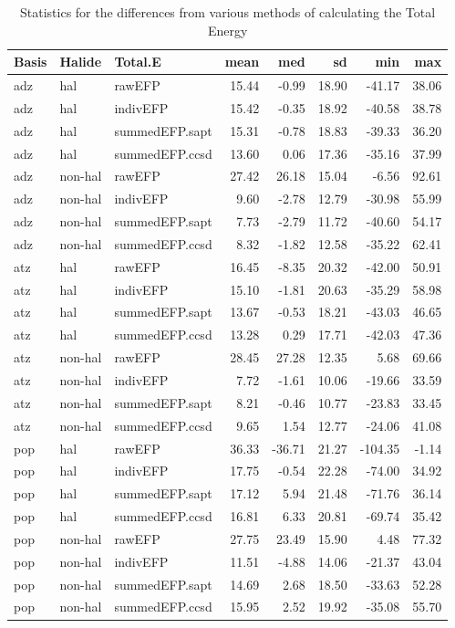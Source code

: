 \begin{table}[ht]
\centering
\footnotesize
\begin{tabular}{lllrrrrr}
  \hline
Basis & Halide & Total.E & mean & med & sd & min & max \\ 
  \hline
adz & hal & rawEFP & 15.44 & -0.99 & 18.90 & -41.17 & 38.06 \\ 
  adz & hal & indivEFP & 15.42 & -0.35 & 18.92 & -40.58 & 38.78 \\ 
  adz & hal & summedEFP.sapt & 15.31 & -0.78 & 18.83 & -39.33 & 36.20 \\ 
  adz & hal & summedEFP.ccsd & 13.60 & 0.06 & 17.36 & -35.16 & 37.99 \\ 
  adz & non-hal & rawEFP & 27.42 & 26.18 & 15.04 & -6.56 & 92.61 \\ 
  adz & non-hal & indivEFP & 9.60 & -2.78 & 12.79 & -30.98 & 55.99 \\ 
  adz & non-hal & summedEFP.sapt & 7.73 & -2.79 & 11.72 & -40.60 & 54.17 \\ 
  adz & non-hal & summedEFP.ccsd & 8.32 & -1.82 & 12.58 & -35.22 & 62.41 \\ 
  atz & hal & rawEFP & 16.45 & -8.35 & 20.32 & -42.00 & 50.91 \\ 
  atz & hal & indivEFP & 15.10 & -1.81 & 20.63 & -35.29 & 58.98 \\ 
  atz & hal & summedEFP.sapt & 13.67 & -0.53 & 18.21 & -43.03 & 46.65 \\ 
  atz & hal & summedEFP.ccsd & 13.28 & 0.29 & 17.71 & -42.03 & 47.36 \\ 
  atz & non-hal & rawEFP & 28.45 & 27.28 & 12.35 & 5.68 & 69.66 \\ 
  atz & non-hal & indivEFP & 7.72 & -1.61 & 10.06 & -19.66 & 33.59 \\ 
  atz & non-hal & summedEFP.sapt & 8.21 & -0.46 & 10.77 & -23.83 & 33.45 \\ 
  atz & non-hal & summedEFP.ccsd & 9.65 & 1.54 & 12.77 & -24.06 & 41.08 \\ 
  pop & hal & rawEFP & 36.33 & -36.71 & 21.27 & -104.35 & -1.14 \\ 
  pop & hal & indivEFP & 17.75 & -0.54 & 22.28 & -74.00 & 34.92 \\ 
  pop & hal & summedEFP.sapt & 17.12 & 5.94 & 21.48 & -71.76 & 36.14 \\ 
  pop & hal & summedEFP.ccsd & 16.81 & 6.33 & 20.81 & -69.74 & 35.42 \\ 
  pop & non-hal & rawEFP & 27.75 & 23.49 & 15.90 & 4.48 & 77.32 \\ 
  pop & non-hal & indivEFP & 11.51 & -4.88 & 14.06 & -21.37 & 43.04 \\ 
  pop & non-hal & summedEFP.sapt & 14.69 & 2.68 & 18.50 & -33.63 & 52.28 \\ 
  pop & non-hal & summedEFP.ccsd & 15.95 & 2.52 & 19.92 & -35.08 & 55.70 \\ 
   \hline
\end{tabular}
    \caption{Statistics for the differences from various methods of calculating the Total Energy \label{tab:si.stats.recast}}
\end{table}


